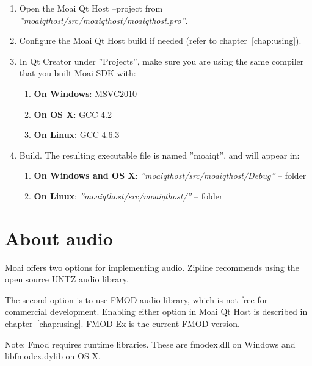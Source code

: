 \begin{enumerate}
\item Open the Moai Qt Host --project from \textit{''moaiqthost/src/moaiqthost/moaiqthost.pro''}.

\item Configure the Moai Qt Host build if needed (refer to chapter~\ref{chap:using}).

\item In Qt Creator under ''Projects'', make sure you are using the same compiler that you built Moai SDK with:
	\begin{enumerate}
	\item \textbf{On Windows}: MSVC2010
	\item \textbf{On OS X}: GCC 4.2
	\item \textbf{On Linux}: GCC 4.6.3
	\end{enumerate}
	
\item Build. The resulting executable file is named ''moaiqt'', and will appear in:
	\begin{enumerate}
	\item \textbf{On Windows and OS X}: \textit{''moaiqthost/src/moaiqthost/Debug''} -- folder
	\item \textbf{On Linux}: \textit{''moaiqthost/src/moaiqthost/''} -- folder
	\end{enumerate}
\end{enumerate}

\section{About audio}
\label{sec:aboutaudio}

Moai offers two options for implementing audio. 
Zipline recommends using the open source UNTZ audio library. 

The second option is to use FMOD audio library, which is not free for commercial development.
Enabling either option in Moai Qt Host is described in chapter~\ref{chap:using}. FMOD Ex is the current FMOD version.

Note: Fmod requires runtime libraries. These are fmodex.dll on Windows  and libfmodex.dylib on OS X.
